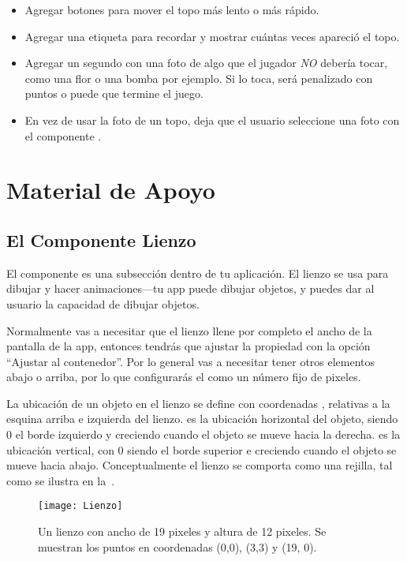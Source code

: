 {{\begin{itemize}

\item Agregar botones para mover el topo más lento o más rápido.
\item Agregar una etiqueta para recordar y mostrar cuántas veces
  apareció el topo.
\item Agregar un segundo  con una foto de algo
  que el jugador \emph{NO} debería tocar, como una flor o una bomba
  por ejemplo. Si lo toca, será penalizado con puntos o puede que
  termine el juego.
\item En vez de usar la foto de un topo, deja que el usuario
  seleccione una foto con el componente
  .
\end{itemize}

\section{Material de Apoyo}

\subsection*{El Componente Lienzo}

El componente  es una subsección dentro de tu
aplicación. El lienzo se usa para dibujar y hacer animaciones---tu app
puede dibujar objetos, y puedes dar al usuario la capacidad de dibujar
objetos.

Normalmente vas a necesitar que el lienzo llene por completo el ancho
de la pantalla de la app, entonces tendrás que ajustar la propiedad
 con la opción ``Ajustar al contenedor''. Por lo
general vas a necesitar tener otros elementos abajo o arriba, por lo
que configurarás el  como un número fijo de pixeles.

La ubicación de un objeto en el lienzo se define con coordenadas
,  relativas a la esquina arriba e izquierda
del lienzo.  es la ubicación horizontal del objeto, siendo
0 el borde izquierdo y  creciendo cuando el objeto se
mueve hacia la derecha.  es la ubicación vertical, con 0
siendo el borde superior e  creciendo cuando el objeto se
mueve hacia abajo. Conceptualmente el lienzo se comporta como una
rejilla, tal como se ilustra en la~.

\begin{figure}[H]
\centering
\texttt{[image: Lienzo]}
\caption{Un lienzo con ancho de 19 pixeles y altura de 12 pixeles. Se
  muestran los puntos en coordenadas (0,0), (3,3) y (19, 0).}
\label{fig:Lienzo}
\end{figure}

}}
